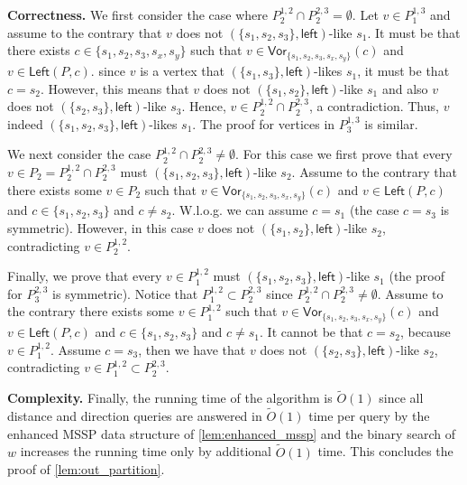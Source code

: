 \documentclass{article}
\newcommand{\Left}{\mathsf{Left}}
\newcommand{\leftside}{\mathsf{left}}
\newcommand{\Vor}{\textsf{Vor}}
\newcommand{\Otild}{\tilde{O}}
\begin{document}
\medskip
\noindent
{\bf Correctness.}
We first consider the case where $P^{1,2}_2\cap P^{2,3}_2=\emptyset$.
Let $v\in P^{1,3}_1$ and assume to the contrary that $v$ does not $(\{s_1,s_2,s_3\},\leftside)$-like $s_1$.
It must be that there exists $c\in\{s_1,s_2,s_3,s_x,s_y\}$ such that $v\in\Vor_{\{s_1,s_2,s_3,s_x,s_y\}}(c)$ and $v\in\Left(P,c)$.
since $v$ is a vertex that $(\{s_1,s_3\},\leftside)$-likes $s_1$, it must be that $c=s_2$.
However, this means that $v$ does not $(\{s_1,s_2\},\leftside)$-like $s_1$ and also $v$ does not $(\{s_2,s_3\},\leftside)$-like $s_3$.
Hence, $v\in P^{1,2}_2\cap P^{2,3}_2$, a contradiction.
Thus, $v$ indeed $(\{s_1,s_2,s_3\},\leftside)$-likes $s_1$.
The proof for vertices in $P^{1,3}_3$ is similar.

We next consider the case $P^{1,2}_2\cap P^{2,3}_2\ne \emptyset$.
For this case we first prove that every $v\in P_2=P^{1,2}_2\cap P^{2,3}_2$ must $(\{s_1,s_2,s_3\},\leftside)$-like $s_2$.
Assume to the contrary that there exists some $v\in P_2$ such that $v\in\Vor_{\{s_1,s_2,s_3,s_x,s_y\}}(c)$ and $v\in\Left(P,c)$ and $c\in\{s_1,s_2,s_3\}$ and $c\ne s_2$.
W.l.o.g. we can assume $c=s_1$ (the case $c=s_3$ is symmetric).
However, in this case $v$ does not $(\{s_1,s_2\},\leftside)$-like $s_2$, contradicting $v\in P^{1,2}_2$.

Finally, we prove that every $v\in P^{1,2}_1$ must $(\{s_1,s_2,s_3\},\leftside)$-like $s_1$ (the proof for $P^{2,3}_3$ is symmetric).
Notice that $P^{1,2}_1\subset P^{2,3}_2$ since $P^{1,2}_2\cap P^{2,3}_2\ne \emptyset$.
Assume to the contrary there exists some $v\in P^{1,2}_1$ such that $v\in\Vor_{\{s_1,s_2,s_3,s_x,s_y\}}(c)$ and $v\in\Left(P,c)$ and $c\in\{s_1,s_2,s_3\}$ and $c\ne s_1$.
It cannot be that $c=s_2$, because $v\in P^{1,2}_1$.
Assume $c=s_3$, then we have that $v$ does not $(\{s_2,s_3\},\leftside)$-like $s_2$, contradicting $v\in P^{1,2}_1\subset P^{2,3}_2$.

\medskip
\noindent
{\bf Complexity.} Finally, the running time of the algorithm is $\Otild(1)$ since all distance and direction queries are answered in $\Otild(1)$ time per query by the enhanced MSSP data structure of \cref{lem:enhanced_mssp}
and the binary search of $w$ increases the running time only by additional $\Otild(1)$ time.
This concludes the proof of \cref{lem:out_partition}.
\end{document}

